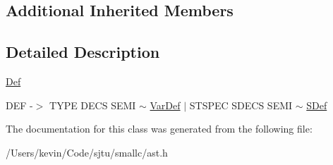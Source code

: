 \subsection*{Additional Inherited Members}


\subsection{Detailed Description}
\hyperlink{class_def}{Def}

D\+EF -\/$>$ T\+Y\+PE D\+E\+CS S\+E\+MI $\sim$ \hyperlink{class_var_def}{Var\+Def} $\vert$ S\+T\+S\+P\+EC S\+D\+E\+CS S\+E\+MI $\sim$ \hyperlink{class_s_def}{S\+Def} 

The documentation for this class was generated from the following file\+:\begin{DoxyCompactItemize}
\item 
/\+Users/kevin/\+Code/sjtu/smallc/ast.\+h\end{DoxyCompactItemize}
